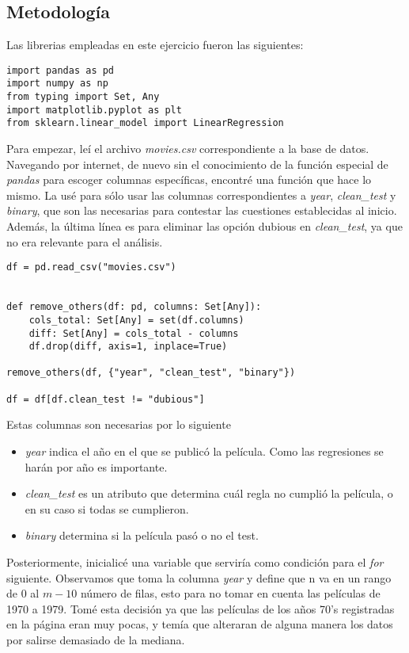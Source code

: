 \documentclass{article}
\begin{document}
\subsection{Metodología}
Las librerias empleadas en este ejercicio fueron las siguientes:

\begin{lstlisting}
import pandas as pd
import numpy as np
from typing import Set, Any 
import matplotlib.pyplot as plt
from sklearn.linear_model import LinearRegression
\end{lstlisting}

Para empezar, leí el archivo \textit{movies.csv} correspondiente a la base de datos. Navegando por internet, de nuevo sin el conocimiento de la función especial de \textit{pandas} para escoger columnas específicas, encontré una función que hace lo mismo. La usé para sólo usar las columnas correspondientes a \textit{year}, \textit{clean\_test} y \textit{binary}, que son las necesarias para contestar las cuestiones establecidas al inicio. Además, la última línea es para eliminar las opción dubious en \textit{clean\_test}, ya que no era relevante para el análisis.

\begin{lstlisting}
df = pd.read_csv("movies.csv")

    
def remove_others(df: pd, columns: Set[Any]):
    cols_total: Set[Any] = set(df.columns)
    diff: Set[Any] = cols_total - columns
    df.drop(diff, axis=1, inplace=True)
    
remove_others(df, {"year", "clean_test", "binary"})

df = df[df.clean_test != "dubious"]
\end{lstlisting}

Estas columnas son necesarias por lo siguiente
\begin{itemize}
    \item \textit{year} indica el año en el que se publicó la película. Como las regresiones se harán por año es importante.
    \item\textit{clean\_test} es un atributo que determina cuál regla no cumplió la película, o en su caso si todas se cumplieron.
    \item\textit{binary} determina si la película pasó o no el test.
\end{itemize}
Posteriormente, inicialicé una variable que serviría como condición para el \textit{for} siguiente. Observamos que toma la columna \textit{year} y define que n va en un rango de 0 al $m-10$ número de filas, esto para no tomar en cuenta las películas de 1970 a 1979. Tomé esta decisión ya que las películas de los años 70's registradas en la página eran muy pocas, y temía que alteraran de alguna manera los datos por salirse demasiado de la mediana.
\end{document}
